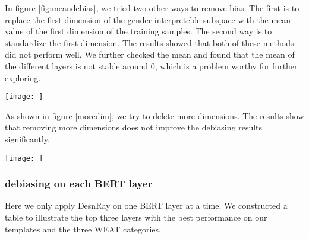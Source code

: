 In figure \ref{fig:meandebias}, we tried two other ways to remove bias. The first is to replace the first dimension of the gender interpreteble subspace with the mean value of the first dimension of the training samples. The second way is to standardize the first dimension. The results showed that both of these methods did not perform well. We further checked the mean and found that the mean of the different layers is not stable around 0, which is a problem worthy for further exploring.
\begin{figure*}
    \centering
    \texttt{[image: ]}
    \caption{Here should be a graph.}
    \label{fig:meandebias}
\end{figure*}

As shown in figure \ref{moredim}, we try to delete more dimensions. The results show that removing more dimensions does not improve the debiasing results significantly.
\begin{figure*}
    \centering
    \texttt{[image: ]}
    \caption{Here should be a graph.}
    \label{fig:moredim}
\end{figure*}

\subsubsection{debiasing on each BERT layer}
Here we only apply DesnRay on one BERT layer at a time. We constructed a table to illustrate the top three layers with the best performance on our templates and the three WEAT categories.
\begin{table*}[ht]
\centering
\begin{tabular}{llllllllll}
\hline
\end{tabular}
\caption{\label{t:bestlayers}
Here needs a table.}
\end{table*}


